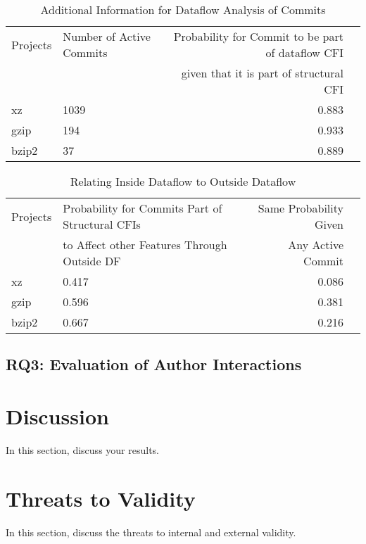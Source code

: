 \begin{table}[t]
\caption{Additional Information for Dataflow Analysis of Commits}
\label{tab:commit_dfbr_table}
\begin{tabular}{llrr}
 Projects & Number of Active Commits & Probability for Commit to be part of dataflow CFI \\
 	  & 			     & given that it is part of structural CFI \\
xz & 1039 & 0.883 \\
gzip & 194 & 0.933 \\
bzip2 & 37 & 0.889 \\
\end{tabular}
\end{table}

\begin{table}[t]
\caption{Relating Inside Dataflow to Outside Dataflow}
\label{tab:commit_dfbr_rel_table}
\begin{tabular}{llrr}
 Projects & Probability for Commits Part of Structural CFIs & Same Probability Given 	\\
 	  & to Affect other Features Through Outside DF     & Any Active Commit		\\
xz & 0.417 & 0.086 \\
gzip & 0.596 & 0.381 \\
bzip2 & 0.667 & 0.216 \\
\end{tabular}
\end{table}

\subsection*{\textbf{RQ3: Evaluation of Author Interactions}}\label{sec:eval_author_interactions}

\section{Discussion}\label{sec:discussion}

In this section, discuss your results.

\section{Threats to Validity}\label{sec:threats}

In this section, discuss the threats to internal and external validity.
